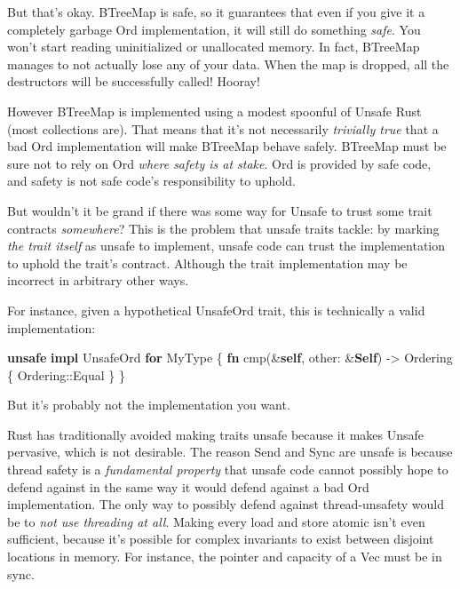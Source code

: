 \documentclass[a4paper,]{book}
\newenvironment{Shaded}{\begin{snugshade}}{\end{snugshade}}
\newcommand{\KeywordTok}[1]{\textcolor[rgb]{0.13,0.29,0.53}{\textbf{{#1}}}}
\newcommand{\NormalTok}[1]{{#1}}
\begin{document}
But that's okay. BTreeMap is safe, so it guarantees that even if you
give it a completely garbage Ord implementation, it will still do
something \emph{safe}. You won't start reading uninitialized or
unallocated memory. In fact, BTreeMap manages to not actually lose any
of your data. When the map is dropped, all the destructors will be
successfully called! Hooray!

However BTreeMap is implemented using a modest spoonful of Unsafe Rust
(most collections are). That means that it's not necessarily
\emph{trivially true} that a bad Ord implementation will make BTreeMap
behave safely. BTreeMap must be sure not to rely on Ord \emph{where
safety is at stake}. Ord is provided by safe code, and safety is not
safe code's responsibility to uphold.

But wouldn't it be grand if there was some way for Unsafe to trust some
trait contracts \emph{somewhere}? This is the problem that unsafe traits
tackle: by marking \emph{the trait itself} as unsafe to implement,
unsafe code can trust the implementation to uphold the trait's contract.
Although the trait implementation may be incorrect in arbitrary other
ways.

For instance, given a hypothetical UnsafeOrd trait, this is technically
a valid implementation:

\begin{Shaded}
\begin{Highlighting}[]
\KeywordTok{unsafe} \KeywordTok{impl} \NormalTok{UnsafeOrd }\KeywordTok{for} \NormalTok{MyType \{}
    \KeywordTok{fn} \NormalTok{cmp(&}\KeywordTok{self}\NormalTok{, other: &}\KeywordTok{Self}\NormalTok{) -> Ordering \{}
        \NormalTok{Ordering::Equal}
    \NormalTok{\}}
\NormalTok{\}}
\end{Highlighting}
\end{Shaded}

But it's probably not the implementation you want.

Rust has traditionally avoided making traits unsafe because it makes
Unsafe pervasive, which is not desirable. The reason Send and Sync are
unsafe is because thread safety is a \emph{fundamental property} that
unsafe code cannot possibly hope to defend against in the same way it
would defend against a bad Ord implementation. The only way to possibly
defend against thread-unsafety would be to \emph{not use threading at
all}. Making every load and store atomic isn't even sufficient, because
it's possible for complex invariants to exist between disjoint locations
in memory. For instance, the pointer and capacity of a Vec must be in
sync.
\end{document}
